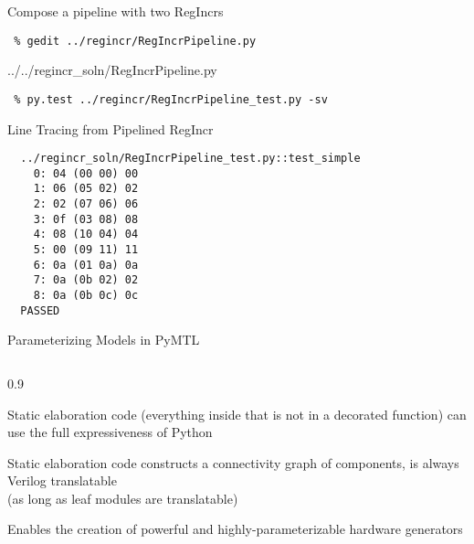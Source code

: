 \begin{task}\begin{frame}[fragile]{Compose a pipeline with two RegIncrs}

\vspace{-0.15in}
\begin{Verbatim}[commandchars=\\\{\}]
 % cd    \midtilde/pymtl-tut/build
 % gedit ../regincr/RegIncrPipeline.py
\end{Verbatim}
\vspace{-0.17in}

%
{../../regincr_soln/RegIncrPipeline.py}

\vspace{-0.2in}
\begin{Verbatim}
 % py.test ../regincr/RegIncrPipeline_test.py -sv
\end{Verbatim}

\end{frame}
\end{task}

\begin{frame}[fragile]{Line Tracing from Pipelined RegIncr}

\begin{Verbatim}
  ../regincr_soln/RegIncrPipeline_test.py::test_simple
    0: 04 (00 00) 00
    1: 06 (05 02) 02
    2: 02 (07 06) 06
    3: 0f (03 08) 08
    4: 08 (10 04) 04
    5: 00 (09 11) 11
    6: 0a (01 0a) 0a
    7: 0a (0b 02) 02
    8: 0a (0b 0c) 0c
  PASSED
\end{Verbatim}

\end{frame}

\begin{frame}{Parameterizing Models in PyMTL}

\medskip
\begin{cbxcols}
\begin{column}{0.9\tw}
\begin{cbxlist}

  \1 Static elaboration code (everything inside  that is
     not in a decorated function) can use the full expressiveness of
     Python

  \1 Static elaboration code constructs a connectivity graph of
     components, is always Verilog translatable \\
     (as long as leaf modules are translatable)

  \1 Enables the creation of powerful and highly-parameterizable
     hardware generators

\end{cbxlist}
\end{column}
\end{cbxcols}
\end{frame}

